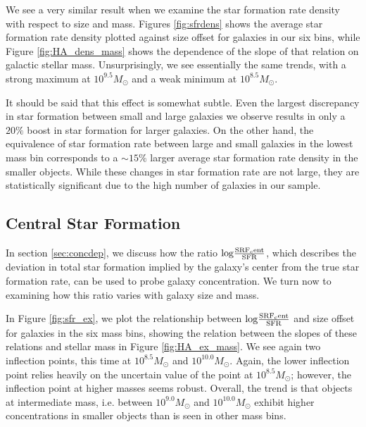 \documentclass[iop]{emulateapj}
\begin{document}
We see a very similar result when we examine the star formation rate density with respect to size and mass. Figures \ref{fig:sfrdens} shows the average star formation rate density plotted against size offset for galaxies in our six bins, while Figure \ref{fig:HA_dens_mass} shows the dependence of the slope of that relation on galactic stellar mass. Unsurprisingly, we see essentially the same trends, with a strong maximum at  $10^{9.5} M_{\odot}$ and a weak minimum at $10^{8.5} M_{\odot}$.

It should be said that this effect is somewhat subtle. Even the largest discrepancy in star formation between small and large galaxies we observe results in only a $20\%$ boost in star formation for larger galaxies. On the other hand, the equivalence of star formation rate between large and small galaxies in the lowest mass bin corresponds to a $\sim 15\%$ larger average star formation rate density in the smaller objects. While these changes in star formation rate are not large, they are statistically significant due to the high number of galaxies in our sample.

\subsection{Central Star Formation}
\label{sec:conc}

In section \ref{sec:concdep}, we discuss how the ratio $\rm log \frac{SRF_cent}{SFR}$, which describes the deviation in total star formation implied by the galaxy's center from the true star formation rate, can be used to probe galaxy concentration. We turn now to examining how this ratio varies with galaxy size and mass.

In Figure \ref{fig:sfr_ex}, we plot the relationship between $\rm log \frac{SRF_cent}{SFR}$ and size offset for galaxies in the six mass bins, showing the relation between the slopes of these relations and stellar mass in Figure \ref{fig:HA_ex_mass}. We see again two inflection points, this time at $10^{8.5} M_{\odot}$ and $10^{10.0} M_{\odot}$. Again, the lower inflection point relies heavily on the uncertain value of the point at $10^{8.5} M_{\odot}$; however, the inflection point at higher masses seems robust. Overall, the trend is that objects at intermediate mass, i.e. between $10^{9.0} M_{\odot}$ and $10^{10.0} M_{\odot}$ exhibit higher concentrations in smaller objects than is seen in other mass bins. 
\end{document}
